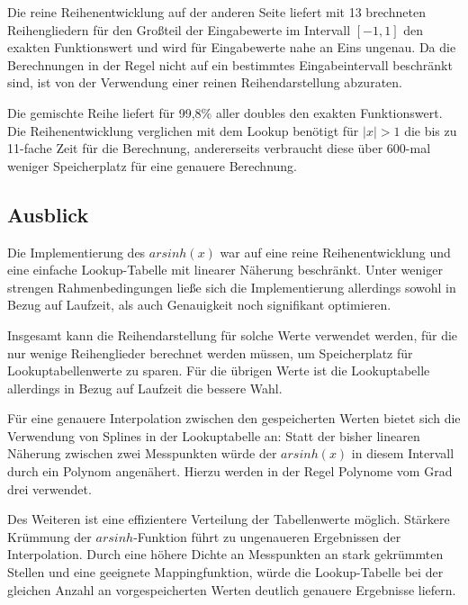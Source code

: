 \documentclass[course=erap] {aspdoc}
\begin{document}
    Die reine Reihenentwicklung auf der anderen Seite liefert mit 13 brechneten Reihengliedern für den Großteil der Eingabewerte im Intervall $[-1, 1]$ den exakten Funktionswert und wird für Eingabewerte nahe an Eins ungenau.
    Da die Berechnungen in der Regel nicht auf ein bestimmtes Eingabeintervall beschränkt sind, ist von der Verwendung einer reinen Reihendarstellung abzuraten.
    

    Die gemischte Reihe liefert für 99,8\% aller doubles den exakten Funktionswert.
    Die Reihenentwicklung verglichen mit dem Lookup benötigt für $|x|>1$ die bis zu 11-fache Zeit für die Berechnung, andererseits verbraucht diese über 600-mal weniger Speicherplatz für eine genauere Berechnung.


    \subsection{Ausblick}\label{subsec:ausblick}

    Die Implementierung des $arsinh(x)$ war auf eine reine Reihenentwicklung und eine einfache Lookup-Tabelle mit linearer Näherung beschränkt.
    Unter weniger strengen Rahmenbedingungen ließe sich die Implementierung allerdings sowohl in Bezug auf Laufzeit, als auch Genauigkeit noch signifikant optimieren.

    Insgesamt kann die Reihendarstellung für solche Werte verwendet werden, für die nur wenige Reihenglieder berechnet werden müssen, um Speicherplatz für Lookuptabellenwerte zu sparen. 
    Für die übrigen Werte ist die Lookuptabelle allerdings in Bezug auf Laufzeit die bessere Wahl. 
    
    Für eine genauere Interpolation zwischen den gespeicherten Werten bietet sich die Verwendung von Splines in der Lookuptabelle an:
    Statt der bisher linearen Näherung zwischen zwei Messpunkten würde der $arsinh(x)$ in diesem Intervall durch ein Polynom angenähert.
    Hierzu werden in der Regel Polynome vom Grad drei verwendet.~\cite{splines}

    Des Weiteren ist eine effizientere Verteilung der Tabellenwerte möglich.
    Stärkere Krümmung der $arsinh$-Funktion führt zu ungenaueren Ergebnissen der Interpolation.
    Durch eine höhere Dichte an Messpunkten an stark gekrümmten Stellen und eine geeignete Mappingfunktion, würde die Lookup-Tabelle bei der gleichen Anzahl an vorgespeicherten Werten deutlich genauere Ergebnisse liefern.
\end{document}
